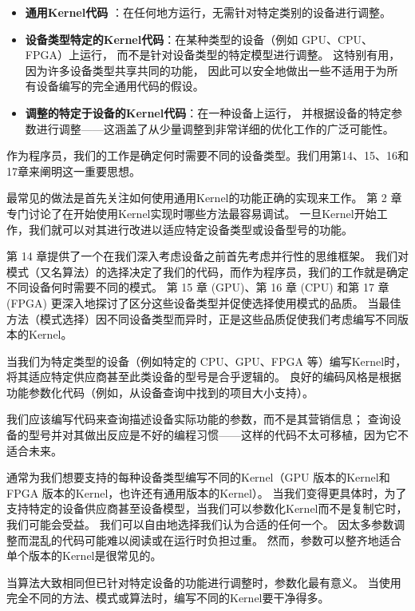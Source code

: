 \begin{itemize}
	\item \textbf{通用Kernel代码} ：在任何地方运行，无需针对特定类别的设备进行调整。

	\item \textbf{设备类型特定的Kernel代码}：在某种类型的设备（例如 GPU、CPU、FPGA）上运行，
	而不是针对设备类型的特定模型进行调整。 这特别有用，因为许多设备类型共享共同的功能，
	因此可以安全地做出一些不适用于为所有设备编写的完全通用代码的假设。

	\item \textbf{调整的特定于设备的Kernel代码}：在一种设备上运行，
	并根据设备的特定参数进行调整——这涵盖了从少量调整到非常详细的优化工作的广泛可能性。
\end{itemize}

\begin{remark}
	作为程序员，我们的工作是确定何时需要不同的设备类型。我们用第14、15、16和17章来阐明这一重要思想。
\end{remark}

最常见的做法是首先关注如何使用通用Kernel的功能正确的实现来工作。 
第 2 章专门讨论了在开始使用Kernel实现时哪些方法最容易调试。 
一旦Kernel开始工作，我们就可以对其进行改进以适应特定设备类型或设备型号的功能。

第 14 章提供了一个在我们深入考虑设备之前首先考虑并行性的思维框架。 
我们对模式（又名算法）的选择决定了我们的代码，而作为程序员，我们的工作就是确定不同设备何时需要不同的模式。 
第 15 章 (GPU)、第 16 章 (CPU) 和第 17 章 (FPGA) 更深入地探讨了区分这些设备类型并促使选择使用模式的品质。 
当最佳方法（模式选择）因不同设备类型而异时，正是这些品质促使我们考虑编写不同版本的Kernel。

当我们为特定类型的设备（例如特定的 CPU、GPU、FPGA 等）编写Kernel时，
将其适应特定供应商甚至此类设备的型号是合乎逻辑的。 
良好的编码风格是根据功能参数化代码（例如，从设备查询中找到的项目大小支持）。

我们应该编写代码来查询描述设备实际功能的参数，而不是其营销信息； 
查询设备的型号并对其做出反应是不好的编程习惯——这样的代码不太可移植，因为它不适合未来。

通常为我们想要支持的每种设备类型编写不同的Kernel（GPU 版本的Kernel和 FPGA 版本的Kernel，也许还有通用版本的Kernel）。 
当我们变得更具体时，为了支持特定的设备供应商甚至设备模型，当我们可以参数化Kernel而不是复制它时，我们可能会受益。 
我们可以自由地选择我们认为合适的任何一个。 因太多参数调整而混乱的代码可能难以阅读或在运行时负担过重。 
然而，参数可以整齐地适合单个版本的Kernel是很常见的。

\begin{remark}
	当算法大致相同但已针对特定设备的功能进行调整时，参数化最有意义。
	当使用完全不同的方法、模式或算法时，编写不同的Kernel要干净得多。
\end{remark}

